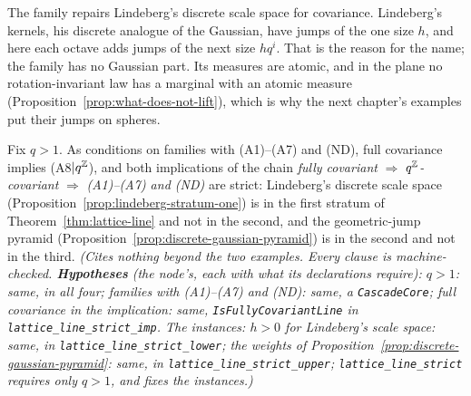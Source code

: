 The family repairs Lindeberg's discrete scale space for covariance. Lindeberg's kernels, his
discrete analogue of the Gaussian, have jumps of the one size $h$, and here each octave adds jumps
of the next size $hq^i$. That is the reason for the name; the family has no Gaussian part. Its
\Levy{} measures are atomic, and in the plane no rotation-invariant law has a
marginal with an atomic \Levy{} measure (Proposition~\ref{prop:what-does-not-lift}), which is why
the next chapter's examples put their jumps on spheres.

\begin{theorem}
\label{cor:lattice-line-strict}
\leanok
{}
Fix $q > 1$. As conditions on families with (A1)--(A7) and (ND), full covariance implies
(A8$|q^{\mathbb{Z}}$), and both implications of the chain
\emph{fully covariant} $\Rightarrow$ \emph{$q^{\mathbb{Z}}$-covariant} $\Rightarrow$ \emph{(A1)--(A7) and
(ND)} are strict: Lindeberg's discrete scale space
(Proposition~\ref{prop:lindeberg-stratum-one}) is in the first stratum of
Theorem~\ref{thm:lattice-line} and not in the second, and the geometric-jump pyramid
(Proposition~\ref{prop:discrete-gaussian-pyramid}) is in the second and not in the third.
\statusT\quad\emph{(Cites nothing beyond the two examples. Every clause is machine-checked.
\textbf{Hypotheses} (the node's, each with what its declarations require): $q > 1$: same, in all four;
families with (A1)--(A7) and (ND): same, a \texttt{CascadeCore}; full covariance in the
implication: same, \texttt{IsFullyCovariantLine} in \texttt{lattice\_line\_strict\_imp}. The
instances: $h > 0$ for Lindeberg's scale space: same, in \texttt{lattice\_line\_strict\_lower};
the weights of Proposition~\ref{prop:discrete-gaussian-pyramid}: same, in
\texttt{lattice\_line\_strict\_upper}; \texttt{lattice\_line\_strict} requires only $q > 1$, and fixes
the instances.)}
\end{theorem}

